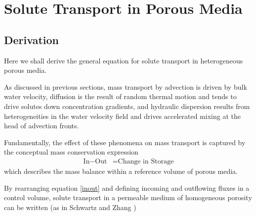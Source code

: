 \section{Solute Transport in Porous Media}

\subsection{Derivation \cite{van_genuchten_analytical_1982, 
leij_analytical_1991}}

Here we shall derive the general equation for solute transport in heterogeneous 
porous media.

As discussed in previous sections, mass transport by advection is driven by bulk 
water velocity, diffusion is the result of random thermal motion and tends  to 
drive solutes down concentration gradients, and hydraulic dispersion
results from heterogeneities in the water velocity field and drives accelerated 
mixing at the head of advection fronts.

Fundamentally, the effect of these phenomena on mass transport is captured by 
the conceptual mass conservation expression \begin{align}
  \mbox{In} - \mbox{Out} &= \mbox{Change in Storage}
  \label{inout}
\end{align} which describes the mass balance within a reference volume of porous 
media.

By rearranging equation \ref{inout} and defining incoming and outflowing fluxes 
in a control  volume,  solute transport in a permeable medium of homogeneous 
porosity can be
written (as in Schwartz and Zhang \cite{schwartz_fundamentals_2003})

